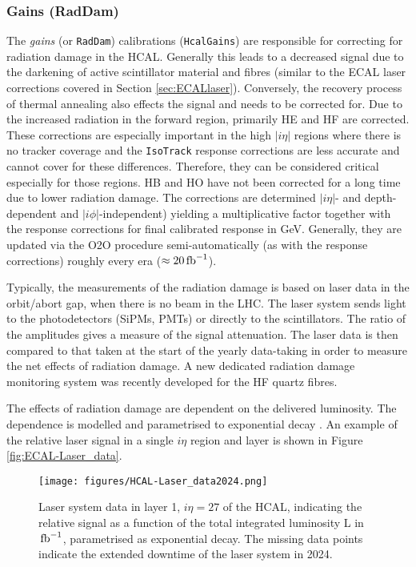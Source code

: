 \subsubsection{Gains (RadDam)}\label{sec:HCAL_gains}
The \textit{gains} (or \texttt{RadDam}) calibrations (\texttt{HcalGains}) are responsible for correcting for radiation damage in the HCAL. Generally this leads to a decreased signal due to the darkening of active scintillator material and fibres (similar to the ECAL laser corrections covered in Section \ref{sec:ECALlaser}). Conversely, the recovery process of thermal annealing also effects the signal and needs to be corrected for. Due to the increased radiation in the forward region, primarily HE and HF are corrected. These corrections are especially important in the high $|i\eta|$ regions where there is no tracker coverage and the \texttt{IsoTrack} response corrections are less accurate and cannot cover for these differences. Therefore, they can be considered critical especially for those regions. HB and HO have not been corrected for a long time due to lower radiation damage. The corrections are determined $|i\eta|$- and depth-dependent and $|i\phi|$-independent) yielding a multiplicative factor together with the response corrections for final calibrated response in GeV. Generally, they are updated via the O2O procedure semi-automatically (as with the response corrections) roughly every era ($\approx 20 \mbox{\ensuremath{\,\text{fb}^{-1}}}$).

Typically, the measurements of the radiation damage is based on laser data in the orbit/abort gap, when there is no beam in the LHC. The laser system sends light to the photodetectors (SiPMs, PMTs) or directly to the scintillators. The ratio of the amplitudes gives a measure of the signal attenuation. The laser data is then compared to that taken at the start of the yearly data-taking in order to measure the net effects of radiation damage. A new dedicated radiation damage monitoring system was recently developed for the HF quartz fibres. 

The effects of radiation damage are dependent on the delivered luminosity. The dependence is modelled and parametrised to exponential decay \cite{CMS-PRF-18-003}. An example of the relative laser signal in a single $i\eta$ region and layer is shown in Figure \ref{fig:ECAL-Laser_data}. 

\begin{figure}[h!]	
\centering
\texttt{[image: figures/HCAL-Laser\_data2024.png]} %
\caption{Laser system data in layer 1, $i\eta = 27$ of the HCAL, indicating the relative signal as a function of the total integrated luminosity L in $\mbox{\ensuremath{\,\text{fb}^{-1}}}$, parametrised as exponential decay. The missing data points indicate the extended downtime of the laser system in 2024.}
\label{fig:HCAL-Laser_data}
\end{figure}

